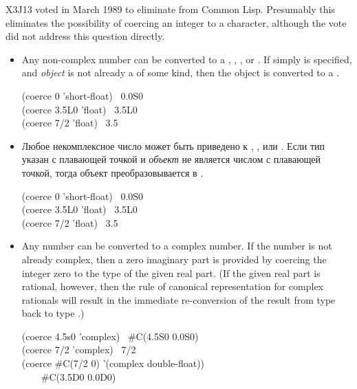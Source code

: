 \begin{defun}[Function]
\begin{newer}
X3J13 voted in March 1989 
to eliminate  from Common Lisp.
Presumably this eliminates the possibility of coercing an
integer to a character, although the vote did not address
this question directly.
\end{newer}

\begin{itemize}
\item
Any non-complex number can be converted to a ,
, , or .  If simply 
is specified, and \emph{object} is not already a  of some kind, then
the object is converted to a .
\begin{lisp}
(coerce 0 'short-float) \EV\ 0.0S0 \\
(coerce 3.5L0 'float) \EV\ 3.5L0 \\
(coerce 7/2 'float) \EV\ 3.5
\end{lisp}

\item
Любое некомплексное число может быть приведено к ,
,  или . Если тип указан с
плавающей точкой и \emph{объект} не является числом с плавающей точкой, тогда
объект преобразовывается в .

\begin{lisp}
(coerce 0 'short-float) \EV\ 0.0S0 \\
(coerce 3.5L0 'float) \EV\ 3.5L0 \\
(coerce 7/2 'float) \EV\ 3.5
\end{lisp}

\item
Any number can be converted to a complex number.
If the number is not already complex, then a zero imaginary part
is provided by coercing the integer zero to the type of the given real part.
(If the given real part is rational, however, then the rule of
canonical representation for complex rationals will result
in the immediate re-conversion of the result from type 
back to type .)

\begin{lisp}
(coerce 4.5s0 'complex) \EV\ \#C(4.5S0 0.0S0) \\
(coerce 7/2 'complex) \EV\ 7/2 \\
(coerce \#C(7/2 0) '(complex double-float)) \\
~~~\EV\ \#C(3.5D0 0.0D0)
\end{lisp}


\end{itemize}
\end{defun}
